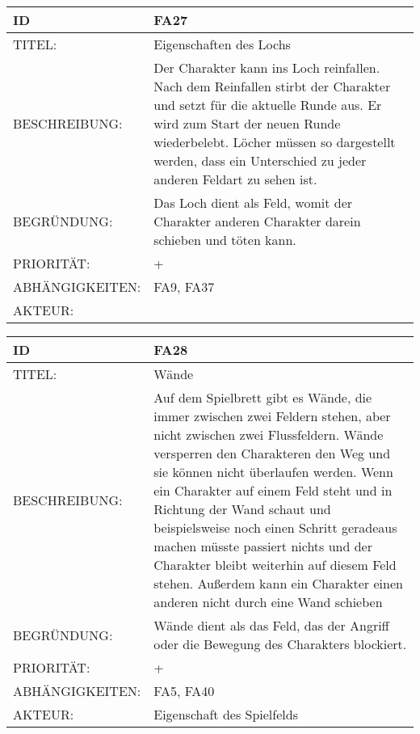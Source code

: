 \documentclass{uulm-assignment}
\begin{document}
    \begin{tabularx}{\textwidth}{|l|X |} \hline
        \textbf{ID} & \textbf{FA27} \\
        \hline
        TITEL: &  Eigenschaften des Lochs\\
        \hline
        BESCHREIBUNG: & Der Charakter kann ins Loch reinfallen. Nach dem Reinfallen stirbt der Charakter und setzt für die aktuelle
Runde aus. Er wird zum Start der neuen Runde wiederbelebt. Löcher müssen so dargestellt werden,
dass ein Unterschied zu jeder anderen Feldart zu sehen ist.
        \\
        \hline
        BEGRÜNDUNG: & Das Loch dient als Feld, womit der Charakter anderen Charakter darein schieben und töten kann. \\
        \hline
        PRIORITÄT: & +\\
        \hline
        ABHÄNGIGKEITEN: & FA9, FA37 \\
        \hline
        AKTEUR: & \\
        \hline
    \end{tabularx}
    
    \begin{tabularx}{\textwidth}{|l|X |} \hline
        \textbf{ID} & \textbf{FA28} \\
        \hline
        TITEL: &  Wände\\
        \hline
        BESCHREIBUNG: & Auf dem Spielbrett gibt es Wände, die immer zwischen zwei Feldern stehen, aber nicht zwischen zwei Flussfeldern. Wände versperren den Charakteren den Weg und sie können nicht überlaufen werden. Wenn ein
Charakter auf einem Feld steht und in Richtung der Wand schaut und beispielsweise noch einen
Schritt geradeaus machen müsste passiert nichts und der Charakter bleibt weiterhin auf diesem Feld
stehen. Außerdem kann ein Charakter einen anderen nicht durch eine Wand schieben
        \\
        \hline
        BEGRÜNDUNG: & Wände dient als das Feld, das der Angriff oder die Bewegung des Charakters blockiert. \\
        \hline
        PRIORITÄT: & +\\
        \hline
        ABHÄNGIGKEITEN: & FA5, FA40\\
        \hline
        AKTEUR: & Eigenschaft des Spielfelds  \\
        \hline
    \end{tabularx}
    
\end{document}
